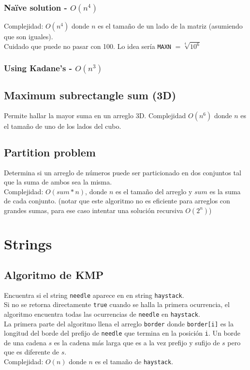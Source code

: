 \documentclass[10pt,letterpaper,twocolumn]{article}
\newcommand{\source}[1]{
	
	\dotfill
}
\begin{document}
		\subsubsection{Naïve solution - $O(n^4)$}
			Complejidad: $O(n^4)$ donde $n$ es el tamaño de un lado de la matriz (asumiendo que son iguales). \\
			Cuidado que puede no pasar con 100. Lo idea sería \texttt{MAXN} $= \sqrt[4]{10^6}$
			\source{./src/maximum2DSum.cpp}
		\subsubsection{Using Kadane's - $O(n^3)$}
			\source{./src/max_2d_sum_kadane.cpp}
	\subsection{Maximum subrectangle sum (3D)}
		Permite hallar la mayor suma en un arreglo 3D.
		Complejidad $O(n^6)$ donde $n$ es el tamaño de uno de los lados del cubo.
		\source{./src/maximum3DSum.cpp}
	\subsection{Partition problem}
		Determina si un arreglo de números puede ser particionado en dos conjuntos tal que la suma de ambos sea la misma. \\
		Complejidad: $O(sum * n)$, donde $n$ es el tamaño del arreglo y $sum$ es la suma de cada conjunto. (notar que este algoritmo no es eficiente para arreglos con grandes sumas, para ese caso intentar una solución recursiva $O(2^n)$)
		\source{./src/partition_problem.cpp}
	
\section{Strings}
	\subsection{Algoritmo de KMP}
		Encuentra si el string \verb|needle| aparece en en string \verb|haystack|.\\
		Si no se retorna directamente \verb|true| cuando se halla la primera ocurrencia, el algoritmo encuentra todas las ocurrencias de \verb|needle| en \verb|haystack|.\\
		La primera parte del algoritmo llena el arreglo \verb|border| donde \verb|border[i]| es la longitud del borde del prefijo de \verb|needle| que termina en la posición \verb|i|. Un borde de una cadena $s$ es la cadena más larga que es a la vez prefijo y sufijo de $s$ pero que es diferente de $s$.\\
		Complejidad: $O(n)$ donde $n$ es el tamaño de \verb|haystack|.\\
		\source{./src/kmp.cpp}
\end{document}
